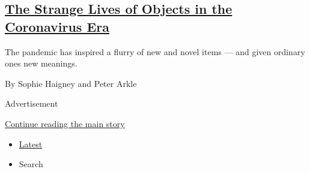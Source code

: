 \begin{enumerate}
  \hypertarget{the-strange-lives-of-objects-in-the-coronavirus-era}{%
  \subsection{\texorpdfstring{\href{/2020/08/01/arts/design/virus-design-objects.html}{The
  Strange Lives of Objects in the Coronavirus
  Era}}{The Strange Lives of Objects in the Coronavirus Era}}\label{the-strange-lives-of-objects-in-the-coronavirus-era}}

  The pandemic has inspired a flurry of new and novel items --- and
  given ordinary ones new meanings.

  By Sophie Haigney and Peter Arkle
\end{enumerate}

Advertisement

\protect\hyperlink{after-mid1}{Continue reading the main story}

\begin{itemize}
\tightlist
\item
  \protect\hyperlink{stream-panel}{Latest}
\item
  Search
\end{itemize}

